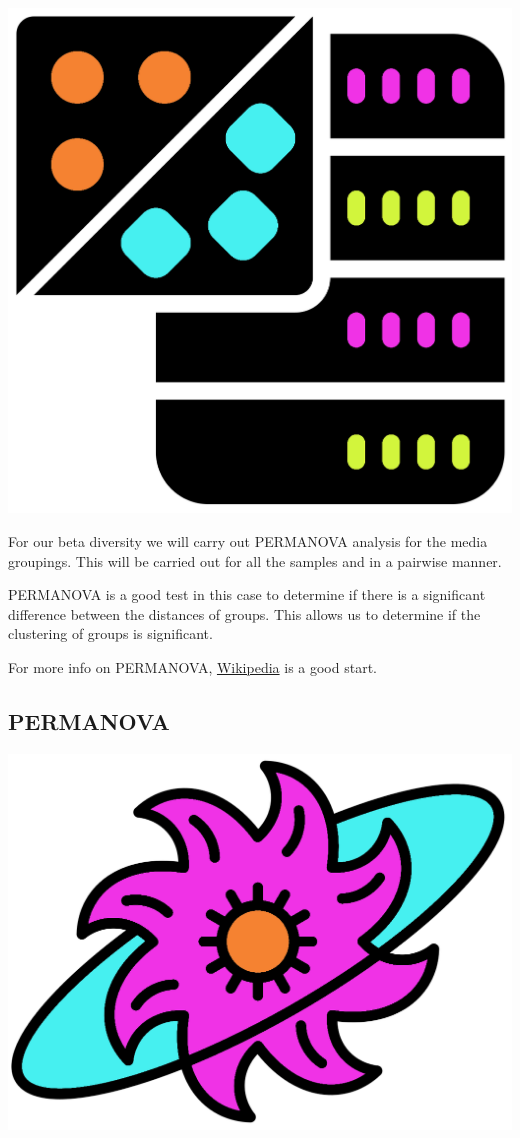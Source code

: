 \documentclass[
]{book}
\begin{document}
\includegraphics{figures/cluster_colours.png}

For our beta diversity we will carry out PERMANOVA analysis for the media groupings.
This will be carried out for all the samples and in a pairwise manner.

PERMANOVA is a good test in this case to determine if there is a significant difference between the distances of groups.
This allows us to determine if the clustering of groups is significant.

For more info on PERMANOVA, \href{https://en.wikipedia.org/wiki/Permutational_analysis_of_variance\#:~:text=Permutational\%20multivariate\%20analysis\%20of\%20variance,are\%20equivalent\%20for\%20all\%20groups.}{Wikipedia} is a good start.

\hypertarget{permanova}{%
\subsection{PERMANOVA}\label{permanova}}

\includegraphics{figures/permanova.png}
\end{document}
